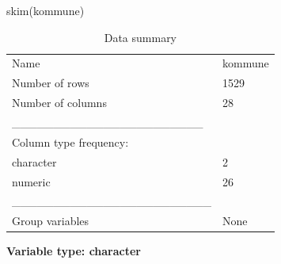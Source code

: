 \documentclass[
  letterpaper,
  DIV=11,
  numbers=noendperiod]{scrreprt}
\newenvironment{Shaded}{\begin{snugshade}}{\end{snugshade}}
\newcommand{\FunctionTok}[1]{\textcolor[rgb]{0.28,0.35,0.67}{#1}}
\newcommand{\NormalTok}[1]{\textcolor[rgb]{0.00,0.23,0.31}{#1}}
\begin{document}
\begin{Shaded}
\begin{Highlighting}[]
\FunctionTok{skim}\NormalTok{(kommune)}
\end{Highlighting}
\end{Shaded}

\begin{longtable}[]{@{}ll@{}}
\caption{Data summary}\tabularnewline
\toprule\noalign{}
\endfirsthead
\endhead
\bottomrule\noalign{}
\endlastfoot
Name & kommune \\
Number of rows & 1529 \\
Number of columns & 28 \\
\_\_\_\_\_\_\_\_\_\_\_\_\_\_\_\_\_\_\_\_\_\_\_ & \\
Column type frequency: & \\
character & 2 \\
numeric & 26 \\
\_\_\_\_\_\_\_\_\_\_\_\_\_\_\_\_\_\_\_\_\_\_\_\_ & \\
Group variables & None \\
\end{longtable}

\textbf{Variable type: character}
\end{document}
